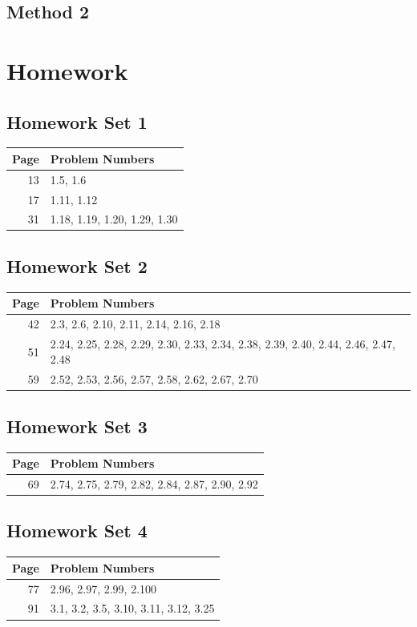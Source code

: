 \documentclass{book}
\begin{document}
\section{Method 2}



\appendix
\chapter{Homework}
\section{Homework Set 1}
\begin{tabular}{r|l}
Page & Problem Numbers\\
\hline
13 & 1.5, 1.6\\
17 & 1.11, 1.12\\
31 & 1.18, 1.19, 1.20, 1.29, 1.30\\
\end{tabular}

\section{Homework Set 2}
\begin{tabular}{r|l}
Page & Problem Numbers\\
\hline
42 & 2.3, 2.6, 2.10, 2.11, 2.14, 2.16, 2.18\\
51 & 2.24, 2.25, 2.28, 2.29, 2.30, 2.33, 2.34, 2.38, 2.39, 2.40, 2.44, 2.46, 2.47, 2.48\\
59 & 2.52, 2.53, 2.56, 2.57, 2.58, 2.62, 2.67, 2.70\\
\end{tabular}

\section{Homework Set 3}
\begin{tabular}{r|l}
Page & Problem Numbers\\
\hline
69 & 2.74, 2.75, 2.79, 2.82, 2.84, 2.87, 2.90, 2.92\\
\end{tabular}

\section{Homework Set 4}
\begin{tabular}{r|l}
Page & Problem Numbers\\
\hline
77 & 2.96, 2.97, 2.99, 2.100\\
91 & 3.1, 3.2, 3.5, 3.10, 3.11, 3.12, 3.25\\
\end{tabular}
\end{document}
